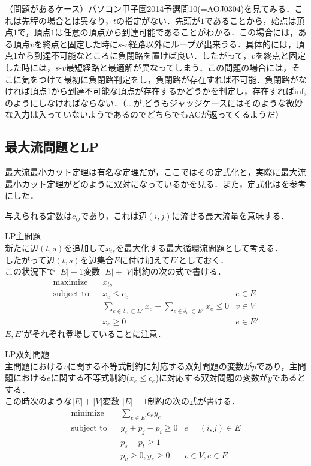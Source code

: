 \documentclass[13pt]{jarticle}
\theoremstyle{nonitalic} %
\begin{document}
（問題があるケース）パソコン甲子園2014予選問10(=AOJ0304)を見てみる．これは先程の場合とは異なり，$t$の指定がない．先頭が$1$であることから，始点は頂点$1$で，頂点$1$は任意の頂点から到達可能であることがわかる．この場合には，ある頂点$v$を終点と固定した時に$s$-$v$経路以外にループが出来うる．具体的には，頂点$1$から到達不可能なところに負閉路を置けば良い．したがって，$v$を終点と固定した時には，$s$-$v$最短経路と最適解が異なってしまう．この問題の場合には，そこに気をつけて最初に負閉路判定をし，負閉路が存在すれば不可能．負閉路がなければ頂点1から到達不可能な頂点が存在するかどうかを判定し，存在すればinf,のようにしなければならない．（...が,どうもジャッジケースにはそのような微妙な入力は入っていないようであるのでどちらでもACが返ってくるようだ）



\subsection{最大流問題とLP}
最大流最小カット定理は有名な定理だが，ここではその定式化と，実際に最大流最小カット定理がどのように双対になっているかを見る．また，定式化は\cite{kinji}を参考にした．

与えられる定数は$c_{ij}$であり，これは辺$(i,j)$に流せる最大流量を意味する．

LP主問題 \\
新たに辺$(t,s)$を追加して$x_{ts}$を最大化する最大循環流問題として考える． \\
したがって辺$(t,s)$を辺集合$E$に付け加えて$E'$としておく．\\
この状況下で $|E|+1$変数 $|E|+|V|$制約の次の式で書ける．
\begin{align}
 &&&&&\textrm{maximize}   && x_{ts}  \\
 &&&&&\textrm{subject to} && x_e\leq c_e & e \in E  &&&&&\\
 &&&&&                    && \sum_{e \in \delta_v^- \subset E'} x_e - \sum_{e \in \delta_v^+  \subset E'} x_e \leq 0 & v \in V &&&&& \\
 &&&&&                    && x_e \geq 0 & e \in E' &&&&&
\end{align}
$E, E'$がそれぞれ登場していることに注意．


LP双対問題 \\
主問題における$v$に関する不等式制約に対応する双対問題の変数が$p$であり，主問題における$e$に関する不等式制約($x_e \leq c_e$)に対応する双対問題の変数が$y$であるとする．\\
この時次のような$|E|+|V|$変数 $|E|+1$制約の次の式が書ける．
\begin{align}
 &&&&&\textrm{minimize}   && \sum_{e \in E} c_e y_e  \\
 &&&&&\textrm{subject to} && y_e + p_j - p_i \geq 0 &  e = (i, j) \in E  &&&&&\\
 &&&&&                    && p_s - p_t  \geq 1         &&&&& \\
 &&&&&                    && p_v \geq 0,  y_e \geq 0 &  v \in V, e \in E &&&&&
\end{align}
\end{document}
